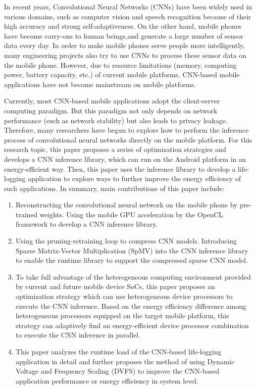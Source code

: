 \cleardoublepage

\begin{enabstract}
In recent years, Convolutional Neural Networks (CNNs) have been widely used in various domains, such as computer vision and speech recognition because of their high accuracy and strong self-adaptiveness. On the other hand, mobile phones have become carry-ons to human beings,and generate a large number of sensor data every day. In order to make mobile phones serve people more intelligently, many engineering projects also try to use CNNs to process these sensor data on the mobile phone. However, due to resource limitations (memory, computing power, battery capacity, etc.) of current mobile platforms, CNN-based mobile applications have not become mainstream on mobile platforms.

Currently, most CNN-based mobile applications adopt the client-server computing paradigm. But this paradigm not only depends on network performance (such as network stability) but also leads to privacy leakage. Therefore, many researchers have begun to explore how to perform the inference process of convolutional neural networks directly on the mobile platform. For this research topic, this paper proposes a series of optimization strategies and develops a CNN inference library, which can run on the Android platform in an energy-efficient way. Then, this paper uses the inference library to develop a life-logging application to explore ways to further improve the energy efficiency of such applications. In summary, main contributions of this paper include:

\begin{enumerate}
  \item Reconstructing the convolutional neural network on the mobile phone by pre-trained weights. Using the mobile GPU acceleration by the OpenCL framework to develop a CNN inference library.
  \item Using the pruning-retraining loop to compress CNN models. Introducing Sparse Matrix-Vector Multiplication (SpMV) into the CNN inference library to enable the runtime library to support the compressed sparse CNN model.
  \item To take full advantage of the heterogeneous computing environment provided by current and future mobile device SoCs, this paper proposes an optimization strategy which can use heterogeneous device processors to execute the CNN inference. Based on the energy efficiency difference among heterogeneous processors equipped on the target mobile platform, this strategy can adaptively find an energy-efficient device processor combination to execute the CNN inference in parallel.
  \item This paper analyzes the runtime load of the CNN-based life-logging application in detail and further proposes the method of using Dynamic Voltage and Frequency Scaling (DVFS) to improve the CNN-based application performance or energy efficiency in system level.
\end{enumerate}


\end{enabstract}
